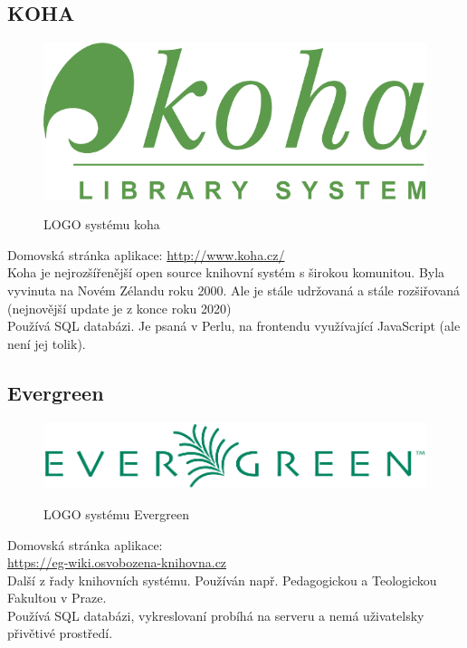 \subsection{KOHA}
\begin{figure}
	\includegraphics[width=\linewidth]{img/KOHA_Logo.png}\\
	\caption[LOGO systému koha ze stránky \url{https://www.mainelibit.org/node/77}]{LOGO systému koha}
\end{figure}
Domovská stránka aplikace: \url{http://www.koha.cz/}\\
Koha je nejrozšířenější open source knihovní systém s širokou komunitou.
Byla vyvinuta na Novém Zélandu roku 2000.
Ale je stále udržovaná a stále rozšiřovaná
(nejnovější update je z konce roku 2020)
\\
Používá SQL databázi.
Je psaná v Perlu, na frontendu využívající JavaScript (ale není jej tolik).

\subsection{Evergreen}
\begin{figure}
	\centering
	\includegraphics[width=\linewidth]{img/Evergreen_Logo.png}\\
	\caption[LOGO systému Evergreen ze stránky \url{https://eg-wiki.osvobozena-knihovna.cz/}]{LOGO systému Evergreen}
\end{figure}
Domovská stránka aplikace: \\\url{https://eg-wiki.osvobozena-knihovna.cz}\\
Další z řady knihovních systému.
Používán např. Pedagogickou a Teologickou Fakultou v Praze.\\
Používá SQL databázi, vykreslovaní probíhá na serveru a nemá uživatelsky přivětivé prostředí.

